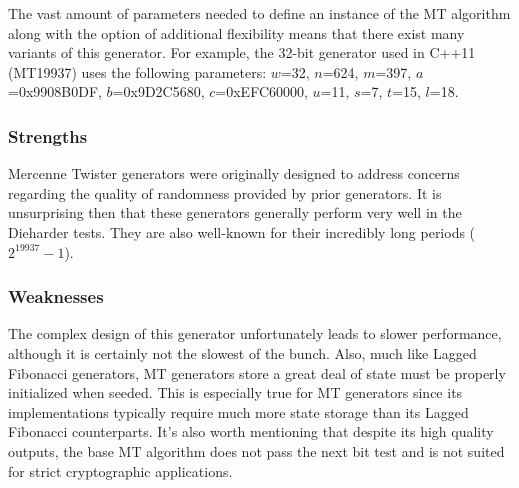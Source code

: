 The vast amount of parameters needed to define an instance of the MT algorithm along with the option of additional flexibility means that there exist many variants of this generator. For example, the 32-bit generator used in C++11 (MT19937) uses the following parameters: $w$=32, $n$=624, $m$=397, $a$=0x9908B0DF, $b$=0x9D2C5680, $c$=0xEFC60000, $u$=11, $s$=7, $t$=15, $l$=18.

\subsubsection{Strengths}
Mercenne Twister generators were originally designed to address concerns regarding the quality of randomness provided by prior generators. It is unsurprising then that these generators generally perform very well in the Dieharder tests. They are also well-known for their incredibly long periods ($2^{19937}-1$).

\subsubsection{Weaknesses}
The complex design of this generator unfortunately leads to slower performance, although it is certainly not the slowest of the bunch. Also, much like Lagged Fibonacci generators, MT generators store a great deal of state must be properly initialized when seeded. This is especially true for MT generators since its implementations typically require much more state storage than its Lagged Fibonacci counterparts. It's also worth mentioning that despite its high quality outputs, the base MT algorithm does not pass the next bit test and is not suited for strict cryptographic applications.
